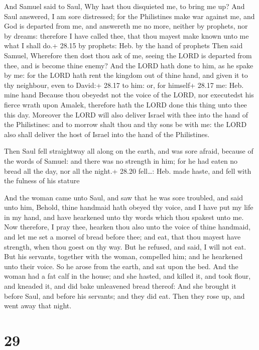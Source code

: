  And Samuel said to Saul, Why hast thou disquieted me, to
bring me up? And Saul answered, I am sore distressed; for the
Philistines make war against me, and God is departed from me, and
answereth me no more, neither by prophets, nor by dreams: therefore I
have called thee, that thou mayest make known unto me what I shall do.+
28.15 by prophets: Heb. by the hand of prophets  Then said
Samuel, Wherefore then dost thou ask of me, seeing the LORD is departed
from thee, and is become thine enemy?  And the LORD hath
done to him, as he spake by me: for the LORD hath rent the kingdom out
of thine hand, and given it to thy neighbour, even to David:+ 28.17 to
him: or, for himself+ 28.17 me: Heb. mine hand  Because
thou obeyedst not the voice of the LORD, nor executedst his fierce wrath
upon Amalek, therefore hath the LORD done this thing unto thee this day.
 Moreover the LORD will also deliver Israel with thee into
the hand of the Philistines: and to morrow shalt thou and thy sons be
with me: the LORD also shall deliver the host of Israel into the hand of
the Philistines.

 Then Saul fell straightway all along on the earth, and was
sore afraid, because of the words of Samuel: and there was no strength
in him; for he had eaten no bread all the day, nor all the night.+ 28.20
fell\ldots: Heb. made haste, and fell with the fulness of his stature

 And the woman came unto Saul, and saw that he was sore
troubled, and said unto him, Behold, thine handmaid hath obeyed thy
voice, and I have put my life in my hand, and have hearkened unto thy
words which thou spakest unto me.  Now therefore, I pray
thee, hearken thou also unto the voice of thine handmaid, and let me set
a morsel of bread before thee; and eat, that thou mayest have strength,
when thou goest on thy way.  But he refused, and said, I
will not eat. But his servants, together with the woman, compelled him;
and he hearkened unto their voice. So he arose from the earth, and sat
upon the bed.  And the woman had a fat calf in the house;
and she hasted, and killed it, and took flour, and kneaded it, and did
bake unleavened bread thereof:  And she brought it before
Saul, and before his servants; and they did eat. Then they rose up, and
went away that night.

\hypertarget{section-28}{%
\section{29}\label{section-28}}

